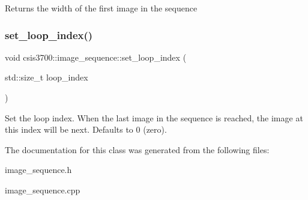 Returns the width of the first image in the sequence \mbox{\label{classcsis3700_1_1image__sequence_aa1a83d01babd833a16ac89759a4e0a57}} 
\subsubsection{\texorpdfstring{set\+\_\+loop\+\_\+index()}{set\_loop\_index()}}
{\footnotesize\ttfamily void csis3700\+::image\+\_\+sequence\+::set\+\_\+loop\+\_\+index (\begin{DoxyParamCaption}\item[{std\+::size\+\_\+t}]{loop\+\_\+index }\end{DoxyParamCaption})}

Set the loop index. When the last image in the sequence is reached, the image at this index will be next. Defaults to 0 (zero). 

The documentation for this class was generated from the following files\+:\begin{DoxyCompactItemize}
\item 
image\+\_\+sequence.\+h\item 
image\+\_\+sequence.\+cpp\end{DoxyCompactItemize}
